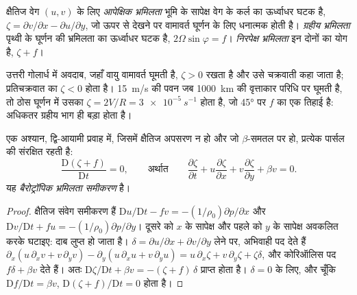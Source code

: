 \begin{definition}[आपेक्षिक, ग्रहीय और निरपेक्ष भ्रमिलता]\label{def:b3:atmospheric-dynamics:vorticity-kinds}
क्षैतिज वेग $(u, v)$ के लिए \emph{आपेक्षिक
भ्रमिलता} भूमि के सापेक्ष वेग के कर्ल का ऊर्ध्वाधर घटक है,
$\zeta = \partial v/\partial x -
\partial u/\partial y$, जो ऊपर से देखने पर वामावर्त घूर्णन के लिए धनात्मक होती है।
\emph{ग्रहीय भ्रमिलता} पृथ्वी के घूर्णन की भ्रमिलता का ऊर्ध्वाधर घटक है,
$2\Omega\sin\varphi =
f$। \emph{निरपेक्ष भ्रमिलता} इन दोनों का योग है,
$\zeta + f$।
\end{definition}

उत्तरी गोलार्ध में अवदाब, जहाँ वायु वामावर्त घूमती है,
$\zeta > 0$ रखता है और उसे चक्रवाती कहा जाता है; प्रतिचक्रवात का $\zeta < 0$ होता है।
\qty{15}{m/s} की पवन जब \qty{1000}{km} की वृत्ताकार परिधि पर घूमती है, तो ठोस घूर्णन में उसका $\zeta =
2V/R = \qty{3e-5}{s^{-1}}$ होता है, जो \ang{45} पर $f$ का एक तिहाई है:
अधिकतर ग्रहीय भाग ही बड़ा होता है।

\begin{theorem}[बैरोट्रॉपिक भ्रमिलता समीकरण]\label{thm:b3:atmospheric-dynamics:bve}
एक अश्यान, द्वि-आयामी प्रवाह में, जिसमें क्षैतिज अपसरण न हो और जो
$\beta$-समतल पर हो, प्रत्येक पार्सल की  संरक्षित रहती है:
\[
\frac{\mathrm D(\zeta + f)}{\mathrm Dt} = 0 ,
\qquad\text{अर्थात}\qquad
\frac{\partial\zeta}{\partial t} + u\frac{\partial\zeta}{\partial x} + v\frac{\partial\zeta}{\partial y} + \beta v = 0 .
\]
यह \emph{बैरोट्रॉपिक भ्रमिलता समीकरण} है।
\end{theorem}

\begin{proof}
क्षैतिज संवेग समीकरण हैं $\mathrm Du/\mathrm Dt - fv =
-(1/\rho_0)\partial p/\partial x$ और $\mathrm Dv/\mathrm Dt + fu =
-(1/\rho_0)\partial p/\partial y$। दूसरे को
$x$ के सापेक्ष और पहले को $y$ के सापेक्ष अवकलित करके घटाइए: दाब लुप्त हो जाता है।
$\delta = \partial u/\partial x + \partial v/\partial y$ लेने पर,
अभिवाही पद देते हैं $\partial_x(u\,\partial_xv + v\,\partial_yv) -
\partial_y(u\,\partial_xu + v\,\partial_yu) = u\,\partial_x\zeta +
v\,\partial_y\zeta + \zeta\delta$, और कोरिऑलिस पद $f\delta + \beta
v$ देते हैं। अतः $\mathrm D\zeta/\mathrm Dt + \beta v = -(\zeta + f)\,\delta$ प्राप्त होता है।
$\delta = 0$ के लिए, और चूँकि $\mathrm Df/\mathrm Dt = \beta v$, $\mathrm D(\zeta +
f)/\mathrm Dt = 0$ होता है।
\end{proof}

